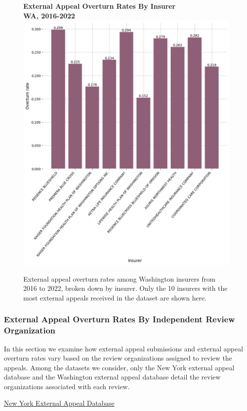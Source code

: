 \documentclass[12pt, a4paper,twoside,parskip=full]{report}
\theoremstyle{plain} %
\theoremstyle{definition} %
\theoremstyle{remark} %
\numberwithin{equation}{chapter}
\begin{document}
		
		\begin{figure}[h!]
			\centering
			\textbf{External Appeal Overturn Rates By Insurer}\\
			\textbf{WA, 2016-2022}\\
			\includegraphics[width=.8\textwidth]{images/wa_external_appeals/overturn_rates_by_insurer.png}
			\caption{External appeal overturn rates among Washington insurers from 2016 to 2022, broken down by insurer. Only the 10 insurers with the most external appeals received in the dataset are shown here.}
			\label{waexternaloverturnsbyinsurer}
		\end{figure}
		\clearpage
		
		\subsubsection{External Appeal Overturn Rates By Independent Review Organization}
		
		In this section we examine how external appeal submissions and external appeal overturn rates vary based on the review organizations assigned to review the appeals. Among the datasets we consider, only the New York external appeal database and the Washington external appeal database detail the review organizations associated with each review.
		
		\underline{New York External Appeal Database}
		
\end{document}
